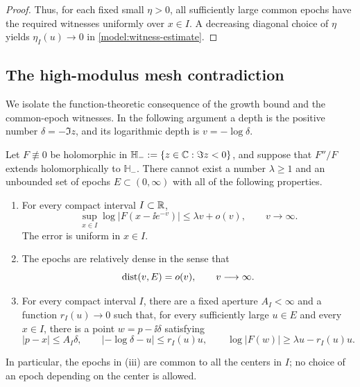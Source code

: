 \begin{proof}
Thus, for each fixed small \(\eta>0\), all sufficiently
large common epochs have the required witnesses
uniformly over \(x\in I\).  A decreasing diagonal
choice of \(\eta\) yields \(\eta_I(u)\to0\) in
\eqref{model:witness-estimate}.
\end{proof}

\subsection{The high-modulus mesh contradiction}

We isolate the function-theoretic consequence of the growth bound and the
common-epoch witnesses.  In the following argument a depth is the positive
number \(\delta=-\Im z\), and its logarithmic depth is
\(v=-\log\delta\).

\begin{theorem}
\label{thm:mesh-contradiction}
Let \(F\not\equiv0\) be holomorphic in
\(\mathbb H_-:=\{z\in\mathbb C:\Im z<0\}\), and suppose that \(F''/F\)
extends holomorphically to \(\mathbb H_-\).  There cannot exist a number
\(\lambda\ge1\) and an unbounded set of epochs
\(E\subset(0,\infty)\) with all of the following properties.
\begin{enumerate}[label=\textup{(\roman*)}]
\item For every compact interval \(I\subset\mathbb R\),
\begin{equation}
 \sup_{x\in I}\log|F(x-\ii e^{-v})|
 \le \lambda v+o(v),\qquad v\longrightarrow\infty.
 \label{model:mesh-upper}
\end{equation}
The error is uniform in \(x\in I\).
\item The epochs are relatively dense in the sense that
\begin{equation}
 \operatorname{dist}(v,E)=o(v),\qquad v\longrightarrow\infty.
 \label{model:mesh-epochs}
\end{equation}
\item For every compact interval \(I\), there are a fixed aperture
\(A_I<\infty\) and a function \(r_I(u)\to0\) such that, for every
sufficiently large \(u\in E\) and every \(x\in I\), there is a point
\(w=p-\ii\delta\) satisfying
\begin{equation}
 |p-x|\le A_I\delta,\qquad
 |{-\log\delta}-u|\le r_I(u)u,\qquad
 \log|F(w)|\ge\lambda u-r_I(u)u.
 \label{model:mesh-witness}
\end{equation}
\end{enumerate}
In particular, the epochs in \textup{(iii)} are common to all the centers
in \(I\); no choice of an epoch depending on the center is allowed.
\end{theorem}

